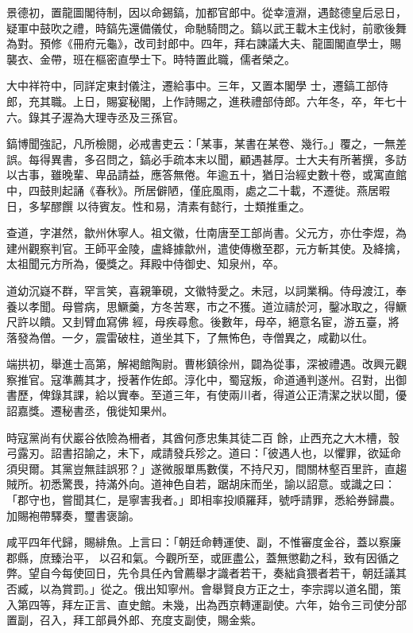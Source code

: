 \begin{pinyinscope}
 景德初，置龍圖閣待制，因以命錫鎬，加都官郎中。從幸澶淵，遇懿德皇后忌日，疑軍中鼓吹之禮，時鎬先還備儀仗，命馳騎問之。鎬以武王載木主伐紂，前歌後舞為對。預修《冊府元龜》，改司封郎中。四年，拜右諫議大夫、龍圖閣直學士，賜襲衣、金帶，班在樞密直學士下。時特置此職，儒者榮之。



 大中祥符中，同詳定東封儀注，遷給事中。三年，又置本閣學
 士，遷鎬工部侍郎，充其職。上日，賜宴秘閣，上作詩賜之，進秩禮部侍郎。六年冬，卒，年七十六。錄其子渥為大理寺丞及三孫官。



 鎬博聞強記，凡所檢閱，必戒書吏云：「某事，某書在某卷、幾行。」覆之，一無差誤。每得異書，多召問之，鎬必手疏本末以聞，顧遇甚厚。士大夫有所著撰，多訪以古事，雖晚輩、卑品請益，應答無倦。年逾五十，猶日治經史數十卷，或寓直館中，四鼓則起誦《春秋》。所居僻陋，僅庇風雨，處之二十載，不遷徙。燕居暇日，多挈醪饌
 以待賓友。性和易，清素有懿行，士類推重之。



 查道，字湛然，歙州休寧人。祖文徽，仕南唐至工部尚書。父元方，亦仕李煜，為建州觀察判官。王師平金陵，盧絳據歙州，遣使傳檄至郡，元方斬其使。及絳擒，太祖聞元方所為，優獎之。拜殿中侍御史、知泉州，卒。



 道幼沉嶷不群，罕言笑，喜親筆硯，文徽特愛之。未冠，以詞業稱。侍母渡江，奉養以孝聞。母嘗病，思鱖羹，方冬苦寒，市之不獲。道泣禱於河，鑿冰取之，得鱖尺許以饋。又刲臂血寫佛
 經，母疾尋愈。後數年，母卒，絕意名宦，游五臺，將落發為僧。一夕，震雷破柱，道坐其下，了無怖色，寺僧異之，咸勸以仕。



 端拱初，舉進士高第，解褐館陶尉。曹彬鎮徐州，闢為從事，深被禮遇。改興元觀察推官。寇準薦其才，授著作佐郎。淳化中，蜀寇叛，命道通判遂州。召對，出御書歷，俾錄其課，給以實奉。至道三年，有使兩川者，得道公正清潔之狀以聞，優詔嘉獎。遷秘書丞，俄徙知果州。



 時寇黨尚有伏巖谷依險為柵者，其酋何彥忠集其徒二百
 餘，止西充之大木槽，彀弓露刃。詔書招諭之，未下，咸請發兵殄之。道曰：「彼遇人也，以懼罪，欲延命須臾爾。其黨豈無詿誤邪？」遂微服單馬數僕，不持尺刃，間關林壑百里許，直趨賊所。初悉驚畏，持滿外向。道神色自若，踞胡床而坐，諭以詔意。或識之曰：「郡守也，嘗聞其仁，是寧害我者。」即相率投順羅拜，號呼請罪，悉給券歸農。加賜袍帶驛奏，璽書褒諭。



 咸平四年代歸，賜緋魚。上言曰：「朝廷命轉運使、副，不惟審度金谷，蓋以察廉郡縣，庶臻治平，
 以召和氣。今觀所至，或匪盡公，蓋無懲勸之科，致有因循之弊。望自今每使回日，先令具任內曾薦舉才識者若干，奏絀貪猥者若干，朝廷議其否臧，以為賞罰。」從之。俄出知寧州。會舉賢良方正之士，李宗諤以道名聞，策入第四等，拜左正言、直史館。未幾，出為西京轉運副使。六年，始令三司使分部置副，召入，拜工部員外郎、充度支副使，賜金紫。




\end{pinyinscope}
